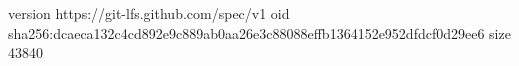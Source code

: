 version https://git-lfs.github.com/spec/v1
oid sha256:dcaeca132c4cd892e9c889ab0aa26e3c88088effb1364152e952dfdcf0d29ee6
size 43840
